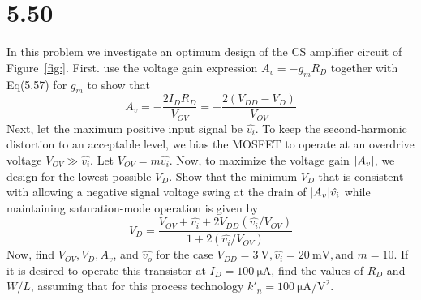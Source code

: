 \documentclass[12pt, a4paper]{article}
\begin{document}
\section{5.50}
In this problem we investigate an optimum design of the CS amplifier circuit of Figure~\ref{fig:}. First. use the voltage gain expression $A_v = -g_m R_D$ together with Eq(5.57) for $g_m$ to show that
\[ A_v = -\frac{2I_D R_D}{V_{OV}} = - \frac{2(V_{DD} - V_D)}{V_{OV}} \]
Next, let the maximum positive input signal be $\hat{v_i}$. To keep the second-harmonic distortion to an acceptable level, we bias the MOSFET to operate at an overdrive voltage $V_{OV} \gg \hat{v_i}$. Let $V_{OV} = m\hat{v_i}$. Now, to maximize the voltage gain $\lvert A_v\rvert$, we design for the lowest possible $V_D$. Show that the minimum $V_D$ that is consistent with allowing a negative signal voltage swing at the drain of $\lvert A_v\rvert\hat{v_i}$ while maintaining saturation-mode operation is given by
\[
  V_D = \frac{V_{OV} + \hat{v_i} + 2 V_{DD} (\hat{v_i}/V_{OV})}{1 + 2(\hat{v_i}/V_{OV})} 
\]
Now, find $V_{OV}, V_D, A_v$, and $\hat{v_o}$ for the case $V_{DD} = \SI{3}{\V}, \hat{v_i} = \SI{20}{\mV}, \text{and } m = 10$. If it is desired to operate this transistor at $I_D = \SI{100}{\uA}$, find the values of $R_D$ and $W/L$, assuming that for this process technology $k'_n = \SI{100}{\uA\per\V\squared}$.
\end{document}
